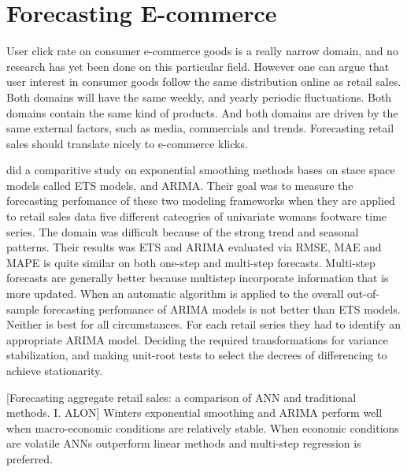 \section{Forecasting E-commerce}
\label{section:RelatedWork:forecasting-ecommerce}
User click rate on consumer e-commerce goods is a really narrow domain, and no
research has yet been done on this particular field.
However one can argue that user interest in consumer goods follow the same distribution
online as retail sales.
Both domains will have the same weekly, and yearly periodic fluctuations.
Both domains contain the same kind of products.
And both domains are driven by the same external factors, such as media, commercials 
and trends.
Forecasting retail sales should translate nicely to e-commerce klicks.

\cite{Ramos2015} did a comparitive study on exponential smoothing 
methods bases on stace space models called ETS models, and ARIMA.
Their goal was to measure the forecasting perfomance of these two modeling frameworks
when they are applied to retail sales data
five different cateogries of univariate womans footware time series.
The domain was difficult because of the strong trend and seasonal patterns.
Their results was ETS and ARIMA evaluated via RMSE, MAE and MAPE is quite similar on both
one-step and multi-step forecasts. Multi-step forecasts are generally better
because multistep incorporate information that is more updated.
When an automatic algorithm is applied to the overall out-of-sample
forecasting perfomance of ARIMA models is not better than ETS models.
Neither is best for all circumstances.
For each retail series they had to identify an appropriate ARIMA model.
Deciding the required transformations for variance stabilization, and making unit-root
tests to select the decrees of differencing to achieve stationarity.


[Forecasting aggregate retail sales: a comparison of ANN and traditional methods. I. ALON]
Winters exponential smoothing and ARIMA perform well when macro-economic
conditions are relatively stable. When economic conditions are volatile
ANNs outperform linear methods and multi-step regression is preferred.

